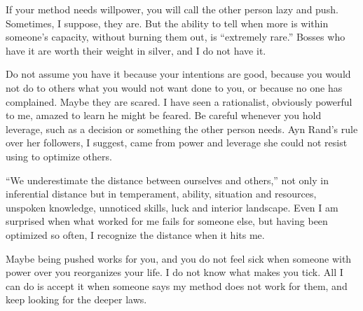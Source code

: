 If your method needs willpower, you will call the other person lazy and push. Sometimes, I suppose, they are. But the ability to tell when more is within someone's capacity, without burning them out, is ``extremely rare.'' Bosses who have it are worth their weight in silver, and I do not have it.

Do not assume you have it because your intentions are good, because you would not do to others what you would not want done to you, or because no one has complained. Maybe they are scared. I have seen a rationalist, obviously powerful to me, amazed to learn he might be feared. Be careful whenever you hold leverage, such as a decision or something the other person needs. Ayn Rand's rule over her followers, I suggest, came from power and leverage she could not resist using to optimize others.

``We underestimate the distance between ourselves and others,'' not only in inferential distance but in temperament, ability, situation and resources, unspoken knowledge, unnoticed skills, luck and interior landscape. Even I am surprised when what worked for me fails for someone else, but having been optimized so often, I recognize the distance when it hits me. 

Maybe being pushed works for you, and you do not feel sick when someone with power over you reorganizes your life. I do not know what makes you tick. All I can do is accept it when someone says my method does not work for them, and keep looking for the deeper laws. 
